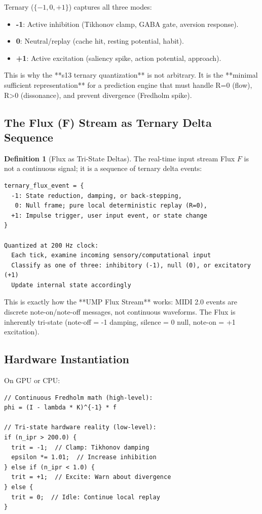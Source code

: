 \documentclass[11pt,oneside]{article}
\theoremstyle{definition}
\newtheorem{definition}[theorem]{Definition}
\begin{document}
Ternary ($\{-1, 0, +1\}$) captures all three modes:

\begin{itemize}
  \item \textbf{-1}: Active inhibition (Tikhonov clamp, GABA gate, aversion response).
  \item \textbf{0}: Neutral/replay (cache hit, resting potential, habit).
  \item \textbf{+1}: Active excitation (saliency spike, action potential, approach).
\end{itemize}

This is why the **s13 ternary quantization** is not arbitrary. It is the **minimal sufficient representation** for a prediction engine that must handle R=0 (flow), R>0 (dissonance), and prevent divergence (Fredholm spike).

\subsection{The Flux (F) Stream as Ternary Delta Sequence}

\begin{definition}[Flux as Tri-State Deltas]
The real-time input stream Flux $F$ is not a continuous signal; it is a sequence of ternary delta events:

\begin{lstlisting}
ternary_flux_event = {
  -1: State reduction, damping, or back-stepping,
   0: Null frame; pure local deterministic replay (R=0),
  +1: Impulse trigger, user input event, or state change
}

Quantized at 200 Hz clock:
  Each tick, examine incoming sensory/computational input
  Classify as one of three: inhibitory (-1), null (0), or excitatory (+1)
  Update internal state accordingly
\end{lstlisting}

This is exactly how the **UMP Flux Stream** works: MIDI 2.0 events are discrete note-on/note-off messages, not continuous waveforms. The Flux is inherently tri-state (note-off = -1 damping, silence = 0 null, note-on = +1 excitation).
\end{definition}

\subsection{Hardware Instantiation}

On GPU or CPU:

\begin{lstlisting}
// Continuous Fredholm math (high-level):
phi = (I - lambda * K)^{-1} * f

// Tri-state hardware reality (low-level):
if (n_ipr > 200.0) {
  trit = -1;  // Clamp: Tikhonov damping
  epsilon *= 1.01;  // Increase inhibition
} else if (n_ipr < 1.0) {
  trit = +1;  // Excite: Warn about divergence
} else {
  trit = 0;  // Idle: Continue local replay
}
\end{lstlisting}
\end{document}
